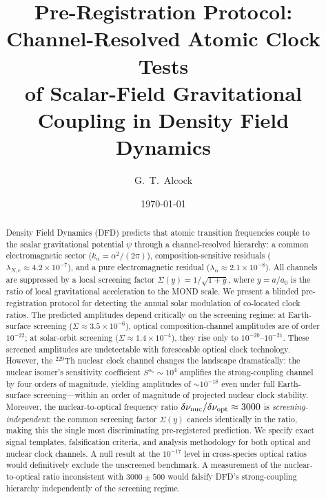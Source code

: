 \documentclass[twocolumn,showpacs,preprintnumbers,amsmath,amssymb,prd]{revtex4-2}
\newcommand{\kalpha}{k_\alpha}
\begin{document}
\title{Pre-Registration Protocol: Channel-Resolved Atomic Clock Tests\\
of Scalar-Field Gravitational Coupling in Density Field Dynamics}

\author{G.~T.~Alcock}

\date{\today}

\begin{abstract}
Density Field Dynamics (DFD) predicts that atomic transition
frequencies couple to the scalar gravitational potential $\psi$
through a channel-resolved hierarchy: a common electromagnetic
sector ($\kalpha = \alpha^2/(2\pi)$), composition-sensitive
residuals ($\lambda_{N,e} \approx 4.2 \times 10^{-7}$), and a
pure electromagnetic residual ($\lambda_\alpha \approx 2.1 \times 10^{-8}$).
All channels are suppressed by a local screening factor
$\Sigma(y) = 1/\sqrt{1+y}$, where $y = a/a_0$ is the ratio of
local gravitational acceleration to the MOND scale.
We present a blinded pre-registration protocol for detecting the
annual solar modulation of co-located clock ratios.
The predicted amplitudes depend critically on the screening regime:
at Earth-surface screening ($\Sigma \approx 3.5 \times 10^{-6}$),
optical composition-channel amplitudes are of order $10^{-22}$; at
solar-orbit screening ($\Sigma \approx 1.4 \times 10^{-4}$), they
rise only to $10^{-20}$--$10^{-21}$.  These screened amplitudes are
undetectable with foreseeable optical clock technology.
However, the $^{229}$Th nuclear clock channel changes the landscape
dramatically: the nuclear isomer's sensitivity coefficient
$S^{\alpha_s} \sim 10^4$ amplifies the strong-coupling channel by
four orders of magnitude, yielding amplitudes of
$\sim 10^{-18}$ even under full Earth-surface screening---within
an order of magnitude of projected nuclear clock stability.
Moreover, the nuclear-to-optical frequency ratio
$\delta\nu_{\rm nuc}/\delta\nu_{\rm opt} \approx 3000$
is \emph{screening-independent}: the common screening factor
$\Sigma(y)$ cancels identically in the ratio, making this the
single most discriminating pre-registered prediction.
We specify exact signal templates, falsification criteria, and
analysis methodology for both optical and nuclear clock channels.
A null result at the $10^{-17}$ level in cross-species optical
ratios would definitively exclude the unscreened benchmark.
A measurement of the nuclear-to-optical ratio inconsistent with
$3000 \pm 500$ would falsify DFD's strong-coupling hierarchy
independently of the screening regime.
\end{abstract}
\end{document}
